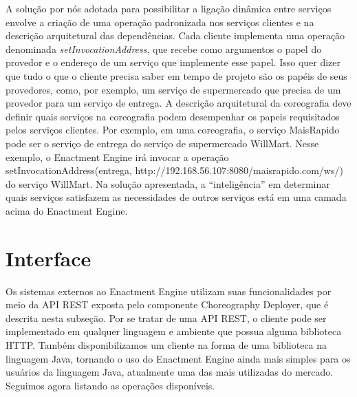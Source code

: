 A solução por nós adotada para possibilitar a ligação dinâmica entre serviços envolve a criação de uma operação padronizada nos serviços clientes e na descrição arquitetural das dependências. Cada cliente implementa uma operação denominada \emph{setInvocationAddress}, que recebe como argumentos o papel do provedor e o endereço de um serviço que implemente esse papel. Isso quer dizer que tudo o que o cliente precisa saber em tempo de projeto são os papéis de seus provedores, como, por exemplo, um serviço de supermercado que precisa de um provedor para um serviço de entrega. A descrição arquitetural da coreografia deve definir quais serviços na coreografia podem desempenhar os papeis requisitados pelos serviços clientes. Por exemplo, em uma coreografia, o serviço MaisRapido pode ser o serviço de entrega do serviço de supermercado WillMart. Nesse exemplo, o Enactment Engine irá invocar a operação setInvocationAddress(entrega, http://192.168.56.107:8080/maisrapido.com/ws/) do serviço WillMart. Na solução apresentada, a ``inteligência'' em determinar quais serviços satisfazem as necessidades de outros serviços está em uma camada acima do Enactment Engine.

\section{Interface}
\label{sec:interface}

Os sistemas externos ao Enactment Engine utilizam suas funcionalidades por meio da API REST exposta pelo componente Choreography Deployer, que é descrita nesta subseção. Por se tratar de uma API REST, o cliente pode ser implementado em qualquer linguagem e ambiente que possua alguma biblioteca HTTP. Também disponibilizamos um cliente na forma de uma biblioteca na linguagem Java, tornando o uso do Enactment Engine ainda mais simples para os usuários da linguagem Java, atualmente uma das mais utilizadas do mercado. Seguimos agora listando as operações disponíveis. 


